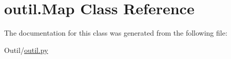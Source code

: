 \hypertarget{classoutil_1_1_map}{}\section{outil.\+Map Class Reference}
\label{classoutil_1_1_map}


The documentation for this class was generated from the following file\+:\begin{DoxyCompactItemize}
\item 
Outil/\hyperlink{outil_8py}{outil.\+py}\end{DoxyCompactItemize}

